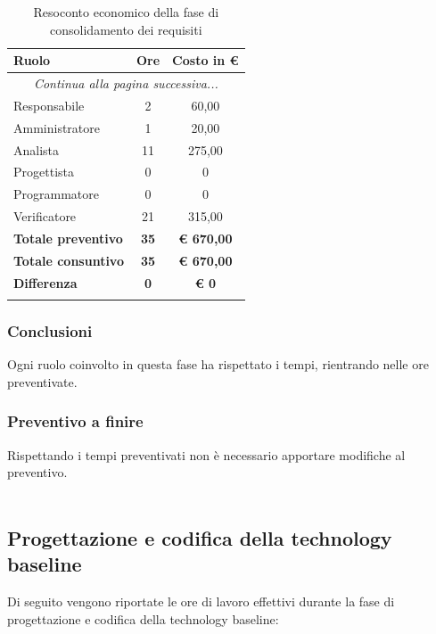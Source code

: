 \documentclass[../piano_di_progetto.tex]{subfiles}
\begin{document}
\begin{center}
	\begin{longtable}{|l|c|c|}
		\hline
		\rowcolor{lightgray}
		\textbf{Ruolo} & \textbf{Ore} & \textbf{Costo in €}\\
		\hline
		\endhead
		
		\hline
		\multicolumn{3}{|c|}{\emph{Continua alla pagina successiva...}}\\
		\hline
		\endfoot

		\endlastfoot
		Responsabile & 	 2 	 & 60,00 \\
		Amministratore & 1 	 & 20,00 \\
		Analista & 		11 	 & 275,00 \\
		Progettista &    0   & 0 \\
		Programmatore &  0   & 0 \\
		Verificatore &   21  & 315,00 \\
		\hline
		\textbf{Totale preventivo} & \textbf{35} & \textbf{€ 670,00} \\
		\hline
		\textbf{Totale consuntivo} & \textbf{35} & \textbf{€ 670,00} \\
		\hline
		\textbf{Differenza} & \textbf{0} & \textbf{€ 0}\\
		\hline
		\rowcolor{white}
		\caption{Resoconto economico della fase di consolidamento dei requisiti}
	\end{longtable}
\end{center}

\subsubsection{Conclusioni}%
\label{sub:cons_con_2}
Ogni ruolo coinvolto in questa fase ha rispettato i tempi, rientrando nelle ore preventivate.

\subsubsection{Preventivo a finire}
\label{sub:cons_prev_fine_2}
Rispettando i tempi preventivati non è necessario apportare modifiche al preventivo. \\ \\

\clearpage
\subsection{Progettazione e codifica della technology baseline}%
\label{sub:cons_prog_tech}
Di seguito vengono riportate le ore di lavoro effettivi durante la fase di progettazione e codifica della technology baseline: \\
\end{document}
